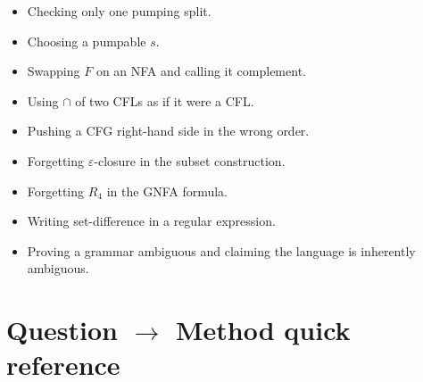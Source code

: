 \documentclass[11pt,a4paper]{article}
\newcommand{\eps}{\varepsilon}
\begin{document}
\begin{itemize}[leftmargin=1.2em]
  \item Checking only one pumping split.
  \item Choosing a pumpable $s$.
  \item Swapping $F$ on an NFA and calling it complement.
  \item Using $\cap$ of two CFLs as if it were a CFL.
  \item Pushing a CFG right-hand side in the wrong order.
  \item Forgetting $\eps$-closure in the subset construction.
  \item Forgetting $R_4$ in the GNFA formula.
  \item Writing set-difference in a regular expression.
  \item Proving a grammar ambiguous and claiming the language is
        inherently ambiguous.
\end{itemize}

\section{Question $\to$ Method quick reference}
\label{sec:quickref}
\end{document}
